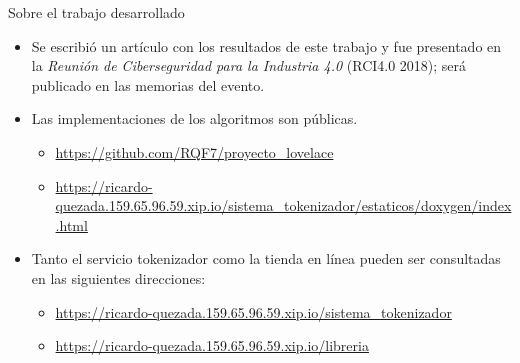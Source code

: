 \begin{frame}{Sobre el trabajo desarrollado}
  \begin{itemize}
    \item Se escribió un artículo con los resultados de este trabajo y fue
      presentado en la \textit{Reunión de Ciberseguridad para la Industria 4.0}
      (RCI4.0 2018); será publicado en las memorias del evento.
    \item Las implementaciones de los algoritmos son públicas.
      \begin{itemize}
        \item \url{https://github.com/RQF7/proyecto_lovelace}
        \item \url{https://ricardo-quezada.159.65.96.59.xip.io/sistema_tokenizador/estaticos/doxygen/index.html}
      \end{itemize}
    \item Tanto el servicio tokenizador como la tienda en línea pueden ser
      consultadas en las siguientes direcciones:
      \begin{itemize}
        \item \url{https://ricardo-quezada.159.65.96.59.xip.io/sistema_tokenizador}
        \item \url{https://ricardo-quezada.159.65.96.59.xip.io/libreria}
      \end{itemize}
  \end{itemize}
\end{frame}
